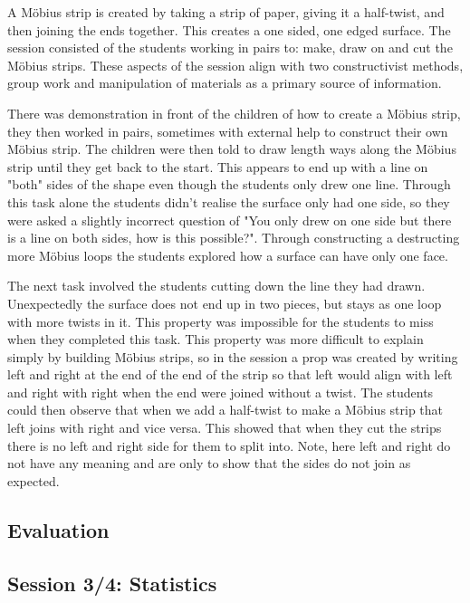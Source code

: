 \documentclass[11pt, a4paper, notitlepage]{article}
\begin{document}
A M\"obius strip is created by taking a strip of paper, giving it a half-twist, and then joining the ends together. This creates a one sided, one edged surface. The session consisted of the students working in pairs to: make, draw on and cut the M\"obius strips. These aspects of the session align with two constructivist methods, group work and manipulation of materials as a primary source of information. 
\par
There was demonstration in front of the children of how to create a M\"obius strip, they then worked in pairs, sometimes with external help to construct their own M\"obius strip. The children were then told to draw length ways along the M\"obius strip until they get back to the start. This appears to end up with a line on "both" sides of the shape even though the students only drew one line. Through this task alone the students didn't realise the surface only had one side, so they were asked a slightly incorrect question of "You only drew on one side but there is a line on both sides, how is this possible?". Through constructing a destructing more M\"obius loops the students explored how a surface can have only one face.
\par
The next task involved the students cutting down the line they had drawn. Unexpectedly the surface does not end up in two pieces, but stays as one loop with more twists in it. This property was impossible for the students to miss when they completed this task. This property was more difficult to explain simply by building M\"obius strips, so in the session a prop was created by writing left and right at the end of the end of the strip so that left would align with left and right with right when the end were joined without a twist. The students could then observe that when we add a half-twist to make a M\"obius strip that left joins with right and vice versa. This showed that when they cut the strips there is no left and right side for them to split into. Note, here left and right do not have any meaning and are only to show that the sides do not join as expected. 
\subsection*{Evaluation}


\subsection{Session 3/4: Statistics}
\end{document}
